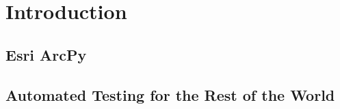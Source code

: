 \section{Introduction}

\subsection{Esri ArcPy}

\subsection{Automated Testing for the Rest of the World}